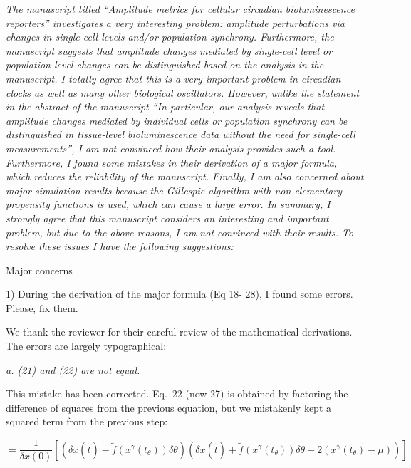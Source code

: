 \documentclass[11pt, letterpaper]{article}
\newenvironment{reviewer}{\itshape\color{gray}}{}
\newenvironment{manuscript}[1]{\begin{center}\begin{tcolorbox}[colback=green!5!white,colframe=green!75!black,width=0.8\textwidth,title={#1},breakable,fonttitle=\bfseries]}{\end{tcolorbox}\end{center}}
\begin{document}
\begin{reviewer}
The manuscript titled ``Amplitude metrics for cellular circadian bioluminescence reporters'' investigates a very interesting problem: amplitude perturbations via changes in single-cell levels and/or population synchrony.
Furthermore, the manuscript suggests that amplitude changes mediated by single-cell level or population-level changes can be distinguished based on the analysis in the manuscript.
I totally agree that this is a very important problem in circadian clocks as well as many other biological oscillators.
However, unlike the statement in the abstract of the manuscript ``In particular, our analysis reveals that amplitude changes mediated by individual cells or population synchrony can be distinguished in tissue-level bioluminescence data without the need for single-cell measurements'', I am not convinced how their analysis provides such a tool.
Furthermore, I found some mistakes in their derivation of a major formula, which reduces the reliability of the manuscript.
Finally, I am also concerned about major simulation results because the Gillespie algorithm with non-elementary propensity functions is used, which can cause a large error.
In summary, I strongly agree that this manuscript considers an interesting and important problem, but due to the above reasons, I am not convinced with their results.
To resolve these issues I have the following suggestions: 
 
Major concerns 
 
1) During the derivation of the major formula (Eq 18- 28), I found some errors. Please, fix them.
\end{reviewer}

We thank the reviewer for their careful review of the mathematical derivations. The errors are largely typographical:

\begin{reviewer}
a. (21) and (22) are not equal. 
\end{reviewer}

This mistake has been corrected.
Eq.~22 (now 27) is obtained by factoring the difference of squares from the previous equation, but we mistakenly kept a squared term from the previous step:

\begin{manuscript}{Page 10}
  \begin{equation}
  = \frac{1}{\delta x(0)} \left[\left(\delta x(\tilde{t}) -
    \tilde{f}\left(x^\gamma(t_\theta)\right)\delta\theta\right) \left(\delta
    x(\tilde{t}) + \tilde{f}\left(x^\gamma(t_\theta)\right)\delta\theta +
    2(x^\gamma(t_\theta) - \mu)\right) \right]
    \tag{27}
  \end{equation}
\end{manuscript}
\end{document}
